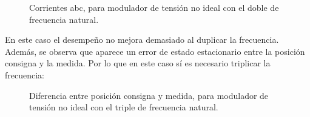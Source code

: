 \documentclass[a4paper, 10pt, onecolumn,journal]{ieeeconf}
\begin{document}
\begin{figure}[H]
	\centering
	\begin{adjustbox}{scale=0.55,max width=\columnwidth}
	\end{adjustbox}
	\caption{Corrientes abc, para modulador de tensión no ideal con el doble de frecuencia natural.}
	\label{Corrientes abc, para modulador de tensión no ideal con el doble de frecuencia natural}
\end{figure}
En este caso el desempeño no mejora demasiado al duplicar la frecuencia. Además, se observa que aparece un error de estado estacionario entre la posición consigna y la medida. Por lo que en este caso sí es necesario triplicar la frecuencia:
\begin{figure}[H]
	\centering
	\begin{adjustbox}{scale=0.58,max width=\columnwidth}
	\end{adjustbox}
	\caption{Diferencia entre posición consigna y medida, para modulador de tensión no ideal con el triple de frecuencia natural.}
	\label{Diferencia entre posición consigna y medida, para modulador de tensión no ideal con el triple de frecuencia natural}
\end{figure}
\end{document}
